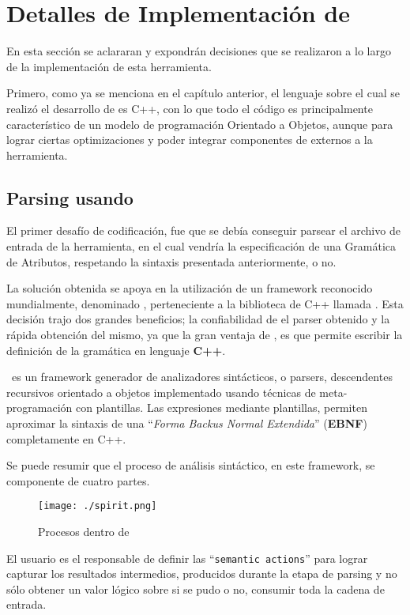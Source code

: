 \chapter{Detalles de Implementación de \maggen}
\label{chap:implem}
\minitoc

En esta sección se aclararan y expondrán decisiones que se realizaron a lo largo de la implementación de esta herramienta.

Primero, como ya se menciona en el capítulo anterior, el lenguaje sobre el cual se realizó el desarrollo de \maggen es C++, con lo que todo el código es principalmente característico de un modelo de programación Orientado a Objetos, aunque para lograr ciertas optimizaciones y poder integrar componentes de externos a la herramienta.

\section{Parsing usando \boost \ \spirit}

El primer desafío de codificación, fue que se debía conseguir parsear el archivo de entrada de la herramienta, en el cual vendría la especificación de una Gramática de Atributos, respetando la sintaxis presentada anteriormente, o no.

La solución obtenida se apoya en la utilización de un framework reconocido mundialmente, denominado \spirit, perteneciente a la biblioteca de C++ llamada \boost. Esta decisión trajo dos grandes beneficios; la confiabilidad de el parser obtenido y la rápida obtención del mismo, ya que la gran ventaja de \spirit, es que permite escribir la definición de la gramática en lenguaje \textbf{C++}.

\spirit\ es un framework generador de analizadores sintácticos, o parsers, descendentes recursivos orientado a objetos implementado usando técnicas de meta-programación con plantillas. Las expresiones mediante plantillas, permiten aproximar la sintaxis de una ``\textit{\textit{Forma Backus Normal Extendida}}'' (\textbf{EBNF}) completamente en C++.

Se puede resumir que el proceso de análisis sintáctico, en este framework, se componente de cuatro partes.

\begin{figure}\centering
\texttt{[image: ./spirit.png]}
\caption{Procesos dentro de \spirit}\label{procesoSpirit}
\end{figure}

El usuario es el responsable de definir las ``\texttt{semantic actions}'' para lograr capturar los resultados intermedios, producidos durante la etapa de parsing y no sólo obtener un valor lógico sobre si se pudo o no, consumir toda la cadena de entrada.


